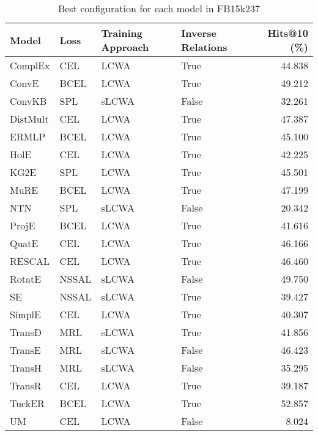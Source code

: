 \begin{table}
\centering
\caption{Best configuration for each model in FB15k237}
\label{best_models_fb15k237}
\begin{tabular}{llllr}
\toprule
   Model &  Loss & Training Approach & Inverse Relations &  Hits@10 (\%) \\
\midrule
 ComplEx &   CEL &              LCWA &              True &       44.838 \\
   ConvE &  BCEL &              LCWA &              True &       49.212 \\
  ConvKB &   SPL &             sLCWA &             False &       32.261 \\
DistMult &   CEL &              LCWA &              True &       47.387 \\
   ERMLP &  BCEL &              LCWA &              True &       45.100 \\
    HolE &   CEL &              LCWA &              True &       42.225 \\
    KG2E &   SPL &              LCWA &              True &       45.501 \\
    MuRE &  BCEL &              LCWA &              True &       47.199 \\
     NTN &   SPL &             sLCWA &             False &       20.342 \\
   ProjE &  BCEL &              LCWA &              True &       41.616 \\
   QuatE &   CEL &              LCWA &              True &       46.166 \\
  RESCAL &   CEL &              LCWA &              True &       46.460 \\
  RotatE & NSSAL &             sLCWA &             False &       49.750 \\
      SE & NSSAL &             sLCWA &              True &       39.427 \\
  SimplE &   CEL &              LCWA &              True &       40.307 \\
  TransD &   MRL &             sLCWA &              True &       41.856 \\
  TransE &   MRL &             sLCWA &             False &       46.423 \\
  TransH &   MRL &             sLCWA &             False &       35.295 \\
  TransR &   CEL &              LCWA &              True &       39.187 \\
  TuckER &  BCEL &              LCWA &              True &       52.857 \\
      UM &   CEL &              LCWA &             False &        8.024 \\
\bottomrule
\end{tabular}
\end{table}

